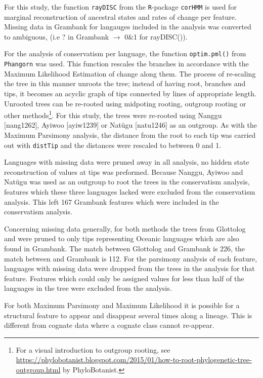 \documentclass[a4paper,10pt]{article} %
\begin{document}
For this study, the function \texttt{rayDISC} from the \texttt{R}-package \texttt{corHMM} \citep{corHMM} is used for marginal reconstruction of ancestral states and rates of change per feature. Missing data in Grambank for langauges included in the analysis was converted to ambiguous, (i.e ? in Grambank $\rightarrow$ 0\&1 for rayDISC()). 

For the analysis of conservatism per language, the function \texttt{optim.pml()} from \texttt{Phangorn} \citep{phangorn} was used. This function rescales the branches in accordance with the Maximum Likelihood Estimation of change along them. The process of re-scaling the tree in this manner unroots the tree; instead of having root, branches and tips, it becomes an acyclic graph of tips connected by lines of appropriate length. Unrooted trees can be re-rooted using midpoting rooting, outgroup rooting or other methods\footnote{For a visual introduction to outgroup rooting, see \href{this blogpost}{https://phylobotanist.blogspot.com/2015/01/how-to-root-phylogenetic-tree-outgroup.html} by PhyloBotanist.}. For this study, the trees were re-rooted using Nanggu [nang1262], Ayiwoo [ayiw1239] or Natügu [natu1246] as an outgroup. As with the Maximum Parsimony analysis, the distance from the root to each tip was carried out with \texttt{distTip} and the distances were rescaled to between 0 and 1. 

Languages with missing data were pruned away in all analysis, no hidden state reconstruction of values at tips was preformed. Because Nanggu, Ayiwoo and Natügu was used as an outgroup to root the trees in the conservatism analysis, features which these three languages lacked were excluded from the conservatism analysis. This left 167 Grambank features which were included in the conservatism analysis. %

Concerning missing data generally, for both methods the trees from Glottolog and \citet{grayetal_2009} were pruned to only tips representing Oceanic languages which are also found in Grambank. The match between Glottolog and Grambank is 226, the match between \citet{grayetal_2009} and Grambank is 112. For the parsimony analysis of each feature, languages with missing data were dropped from the trees in the analysis for that feature. Features which could only be assigned values for less than half of the languages in the tree were excluded from the analysis.

For both Maximum Parsimony and Maximum Likelihood it is possible for a structural feature to appear and disappear several times along a lineage. This is different from cognate data where a cognate class cannot re-appear.
\end{document}
